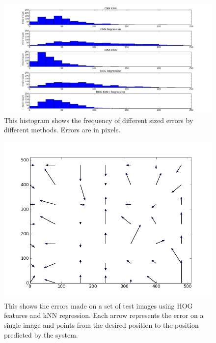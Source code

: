 \documentclass[10pt,twocolumn,letterpaper]{article}
\begin{document}
\begin{figure}
	\begin{center}
		\includegraphics[width=0.9\linewidth]{figures/ClassifierErrorHist.png}
	\end{center}
	\caption{This histogram shows the frequency of different sized errors by different methods.  Errors are in pixels.}
	\label{fig:hist}
\end{figure}

\begin{figure}
		\includegraphics[width=0.9\linewidth]{figures/error_arrows.png}
	\caption{This shows the errors made on a set of test images using HOG features and kNN regression.  Each arrow represents the error on a single image and points from the desired position to the position predicted by the system.}
	\label{fig:error_arrows}
\end{figure}
\end{document}
